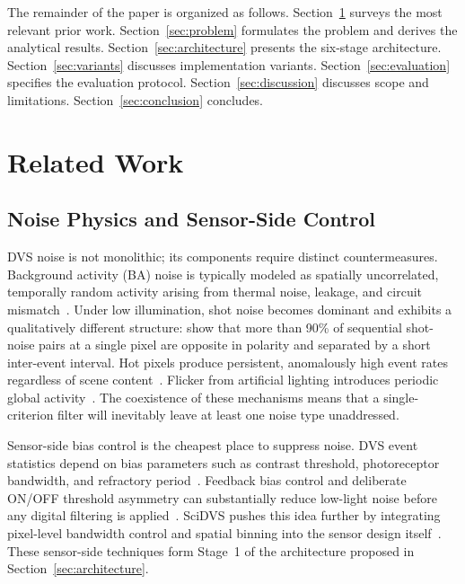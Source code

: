 \documentclass[a4paper,fleqn]{cas-dc}
\begin{document}
The remainder of the paper is organized as follows. Section~\ref{sec:related} surveys the most relevant prior work. Section~\ref{sec:problem} formulates the problem and derives the analytical results. Section~\ref{sec:architecture} presents the six-stage architecture. Section~\ref{sec:variants} discusses implementation variants. Section~\ref{sec:evaluation} specifies the evaluation protocol. Section~\ref{sec:discussion} discusses scope and limitations. Section~\ref{sec:conclusion} concludes.

\section{Related Work}
\label{sec:related}

\subsection{Noise Physics and Sensor-Side Control}
\label{sec:related_noise}

DVS noise is not monolithic; its components require distinct countermeasures. Background activity (BA) noise is typically modeled as spatially uncorrelated, temporally random activity arising from thermal noise, leakage, and circuit mismatch~\citep{gallego2020survey,khodamoradi2018onoise,feng2020density}. Under low illumination, shot noise becomes dominant and exhibits a qualitatively different structure: \citet{mcreynolds2023lowlight} show that more than 90\% of sequential shot-noise pairs at a single pixel are opposite in polarity and separated by a short inter-event interval. Hot pixels produce persistent, anomalously high event rates regardless of scene content~\citep{li2024denoising_spatiotemp}. Flicker from artificial lighting introduces periodic global activity~\citep{wang2022comb,wu2025pfd}. The coexistence of these mechanisms means that a single-criterion filter will inevitably leave at least one noise type unaddressed.

Sensor-side bias control is the cheapest place to suppress noise. DVS event statistics depend on bias parameters such as contrast threshold, photoreceptor bandwidth, and refractory period~\citep{delbruck2021feedback}. Feedback bias control and deliberate ON/OFF threshold asymmetry can substantially reduce low-light noise before any digital filtering is applied~\citep{delbruck2021feedback,mcreynolds2023lowlight}. SciDVS pushes this idea further by integrating pixel-level bandwidth control and spatial binning into the sensor design itself~\citep{graca2024scidvs,graca2023optimal}. These sensor-side techniques form Stage~1 of the architecture proposed in Section~\ref{sec:architecture}.
\end{document}
